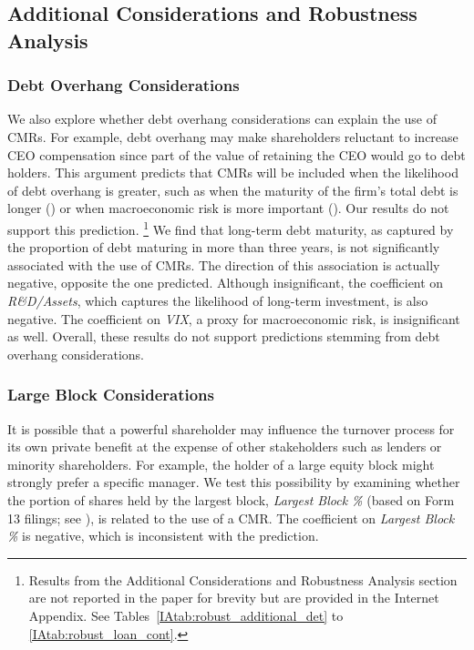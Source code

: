 \documentclass[a4paper,12pt]{article}
\begin{document}
\subsection{Additional Considerations and Robustness Analysis}


\subsubsection{Debt Overhang Considerations}

We also explore whether debt overhang considerations can explain the use of CMRs.
For example, debt overhang may make shareholders reluctant to increase CEO compensation since part of the value of retaining the CEO would go to debt holders.
This argument predicts that CMRs will be included when the likelihood of debt overhang is greater, such as when the maturity of the firm's total debt is longer (\citet{Myers_1977}) or when macroeconomic risk is more important (\citet{Chen_2017}).
Our results do not support this prediction.%
    \footnote{Results from the Additional Considerations and Robustness Analysis section are not reported in the paper for brevity but are provided in the Internet Appendix. See Tables~\ref{IAtab:robust_additional_det} to \ref{IAtab:robust_loan_cont}.}
We find that long-term debt maturity, as captured by the proportion of debt maturing in more than three years, is not significantly associated with the use of CMRs.
The direction of this association is actually negative, opposite the one predicted.
Although insignificant, the coefficient on \textit{R\&D/Assets}, which captures the likelihood of long-term investment, is also negative.
The coefficient on \textit{VIX}, a proxy for macroeconomic risk, is insignificant as well.
Overall, these results do not support predictions stemming from debt overhang considerations.



\subsubsection{Large Block Considerations}

It is possible that a powerful shareholder may influence the turnover process for its own private benefit at the expense of other stakeholders such as lenders or minority shareholders.
For example, the holder of a large equity block might strongly prefer a specific manager.
We test this possibility by examining whether the portion of shares held by the largest block, \textit{Largest Block \%} (based on Form 13 filings; see \citealp{Volkova_2017}), is related to the use of a CMR.
The coefficient on \textit{Largest Block \%} is negative, which is inconsistent with the prediction.
\end{document}
